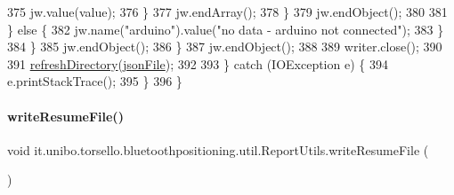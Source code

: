 \begin{DoxyCode}
375                                 jw.value(value);
376                             \}
377                             jw.endArray();
378                         \}
379                         jw.endObject();
380 
381                     \} \textcolor{keywordflow}{else} \{
382                         jw.name(\textcolor{stringliteral}{"arduino"}).value(\textcolor{stringliteral}{"no data - arduino not connected"});
383                     \}
384                 \}
385                 jw.endObject();
386             \}
387             jw.endObject();
388 
389             writer.close();
390 
391             \hyperlink{classit_1_1unibo_1_1torsello_1_1bluetoothpositioning_1_1util_1_1ReportUtils_a5d2a51b68c3344f5aa41abaa118282b4_a5d2a51b68c3344f5aa41abaa118282b4}{refreshDirectory}(\hyperlink{classit_1_1unibo_1_1torsello_1_1bluetoothpositioning_1_1util_1_1ReportUtils_a3d54acab8d9785425b61d7a294444f85_a3d54acab8d9785425b61d7a294444f85}{jsonFile});
392 
393         \} \textcolor{keywordflow}{catch} (IOException e) \{
394             e.printStackTrace();
395         \}
396     \}
\end{DoxyCode}
\hypertarget{classit_1_1unibo_1_1torsello_1_1bluetoothpositioning_1_1util_1_1ReportUtils_af8578f11822b403410e46f023b68dd7b_af8578f11822b403410e46f023b68dd7b}{}\label{classit_1_1unibo_1_1torsello_1_1bluetoothpositioning_1_1util_1_1ReportUtils_af8578f11822b403410e46f023b68dd7b_af8578f11822b403410e46f023b68dd7b} 
\paragraph{\texorpdfstring{write\+Resume\+File()}{writeResumeFile()}}
{\footnotesize\ttfamily void it.\+unibo.\+torsello.\+bluetoothpositioning.\+util.\+Report\+Utils.\+write\+Resume\+File (\begin{DoxyParamCaption}{ }\end{DoxyParamCaption})\hspace{0.3cm}{\ttfamily [private]}}


